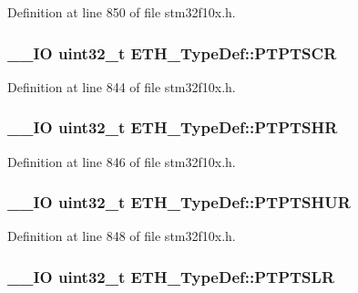 Definition at line 850 of file stm32f10x.\-h.

\hypertarget{struct_e_t_h___type_def_a09c223e5355a8c5885f3e168dd568079}{
\subsubsection[{P\-T\-P\-T\-S\-C\-R}]{\setlength{\rightskip}{0pt plus 5cm}\-\_\-\-\_\-\-I\-O {\bf uint32\-\_\-t} E\-T\-H\-\_\-\-Type\-Def\-::\-P\-T\-P\-T\-S\-C\-R}}\label{struct_e_t_h___type_def_a09c223e5355a8c5885f3e168dd568079}


Definition at line 844 of file stm32f10x.\-h.

\hypertarget{struct_e_t_h___type_def_a30881f198009fd17e28644d9449045f5}{
\subsubsection[{P\-T\-P\-T\-S\-H\-R}]{\setlength{\rightskip}{0pt plus 5cm}\-\_\-\-\_\-\-I\-O {\bf uint32\-\_\-t} E\-T\-H\-\_\-\-Type\-Def\-::\-P\-T\-P\-T\-S\-H\-R}}\label{struct_e_t_h___type_def_a30881f198009fd17e28644d9449045f5}


Definition at line 846 of file stm32f10x.\-h.

\hypertarget{struct_e_t_h___type_def_a5e5c20f4ddc155ec5c7f976ebfb60c2a}{
\subsubsection[{P\-T\-P\-T\-S\-H\-U\-R}]{\setlength{\rightskip}{0pt plus 5cm}\-\_\-\-\_\-\-I\-O {\bf uint32\-\_\-t} E\-T\-H\-\_\-\-Type\-Def\-::\-P\-T\-P\-T\-S\-H\-U\-R}}\label{struct_e_t_h___type_def_a5e5c20f4ddc155ec5c7f976ebfb60c2a}


Definition at line 848 of file stm32f10x.\-h.

\hypertarget{struct_e_t_h___type_def_a56638794c54141bb1b8ef6ac31a6997d}{
\subsubsection[{P\-T\-P\-T\-S\-L\-R}]{\setlength{\rightskip}{0pt plus 5cm}\-\_\-\-\_\-\-I\-O {\bf uint32\-\_\-t} E\-T\-H\-\_\-\-Type\-Def\-::\-P\-T\-P\-T\-S\-L\-R}}\label{struct_e_t_h___type_def_a56638794c54141bb1b8ef6ac31a6997d}


